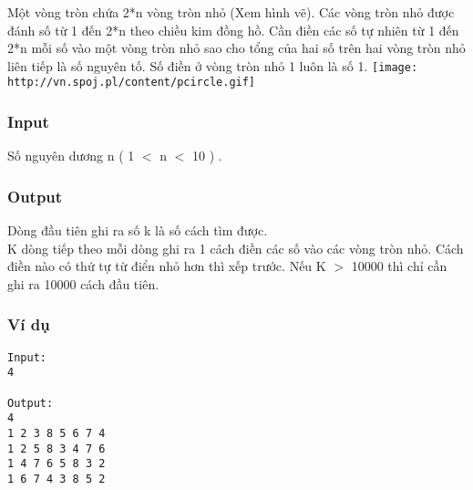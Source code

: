 



   Một vòng tròn chứa 2*n vòng tròn nhỏ (Xem hình vẽ). Các vòng tròn nhỏ được đánh số từ 1 đến 2*n theo chiều kim đồng hồ. Cần điền các số tự nhiên từ 1 đến 2*n mỗi số vào một vòng tròn nhỏ sao cho tổng của hai số trên hai vòng tròn nhỏ liên tiếp là số nguyên tố. Số điền ở vòng tròn nhỏ 1 luôn là số 1.  
\texttt{[image: http://vn.spoj.pl/content/pcircle.gif]}

\subsubsection{   Input  }

   Số nguyên dương n ( 1 $<$ n $<$ 10 ) .  

\subsubsection{   Output  }

   Dòng đầu tiên ghi ra số k là số cách tìm được.   
\\   K dòng tiếp theo mỗi dòng ghi ra 1 cách điền các số vào các vòng tròn nhỏ. Cách điền nào có thứ tự từ điển nhỏ hơn thì xếp trước. Nếu K $>$ 10000 thì chỉ cần ghi ra 10000 cách đầu tiên.  

\subsubsection{   Ví dụ  }
\begin{verbatim}
Input:
4

Output:
4
1 2 3 8 5 6 7 4
1 2 5 8 3 4 7 6
1 4 7 6 5 8 3 2
1 6 7 4 3 8 5 2

\end{verbatim}